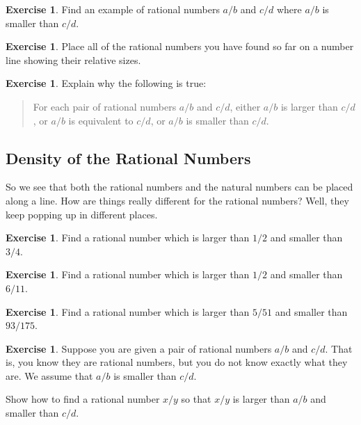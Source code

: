 \documentclass[12pt,letterpaper]{article}
\theoremstyle{definition}
\newtheorem{exercise}[question]{Exercise}
\begin{document}
\begin{exercise}
Find an example of rational numbers $a/b$ and $c/d$ where $a/b$ is smaller than $c/d$.
\end{exercise}

\begin{exercise}
Place all of the rational numbers you have found so far on a number line showing their relative sizes.
\end{exercise}

\begin{exercise}
Explain why the following is true:
\begin{quote}
For each pair of rational numbers $a/b$ and $c/d$, either $a/b$ is larger than $c/d$, or $a/b$ is equivalent to $c/d$, or $a/b$ is smaller than $c/d$.
\end{quote}
\end{exercise}

\subsection*{Density of the Rational Numbers}

So we see that both the rational numbers and the natural numbers can be placed along a line.
How are things really different for the rational numbers?
Well, they keep popping up in different places.

\begin{exercise}
Find a rational number which is larger than $1/2$ and smaller than $3/4$.
\end{exercise}


\begin{exercise}
Find a rational number which is larger than $1/2$ and smaller than $6/11$.
\end{exercise}

\begin{exercise}
Find a rational number which is larger than $5/51$ and smaller than $93/175$.
\end{exercise}

\begin{exercise}
Suppose you are given a pair of rational numbers $a/b$ and $c/d$.
That is, you know they are rational numbers, but you do not know exactly what they are.
We assume that $a/b$ is smaller than $c/d$. 

Show how to find a rational number $x/y$ so that $x/y$ is larger than $a/b$ and smaller than $c/d$.
\end{exercise}
\end{document}

